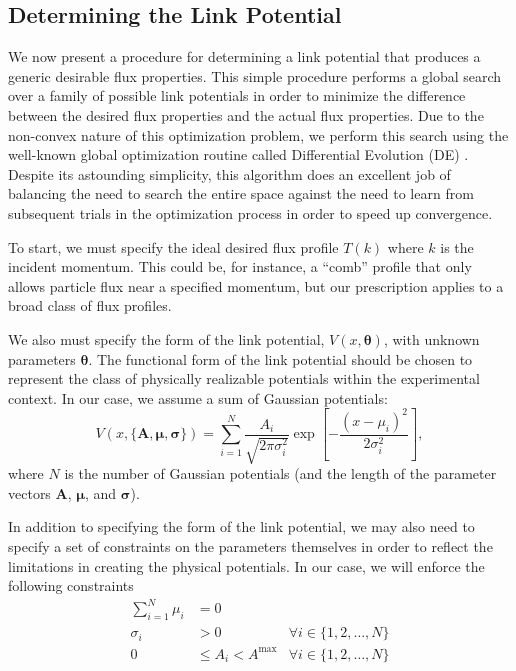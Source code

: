 \documentclass[onecolumn,amsmath,amssymb,nofootinbib,prl]{revtex4-1}
\begin{document}
\subsection{Determining the Link Potential}
We now present a procedure for determining a link potential that produces a generic desirable flux properties. This simple procedure performs a global search over a family of possible link potentials in order to minimize the difference between the desired flux properties and the actual flux properties. Due to the non-convex nature of this optimization problem, we perform this search using the well-known global optimization routine called Differential Evolution (DE) \cite{original DE paper}. Despite its astounding simplicity, this algorithm does an excellent job of balancing the need to search the entire space against the need to learn from subsequent trials in the optimization process in order to speed up convergence. 

To start, we must specify the ideal desired flux profile $T(k)$ where $k$ is the incident momentum. This could be, for instance, a ``comb'' profile that only allows particle flux near a specified momentum, but our prescription applies to a broad class of flux profiles.

We also must specify the form of the link potential, $V(x, \bm{\theta})$, with unknown parameters $\bm{\theta}$. The functional form of the link potential should be chosen to represent the class of physically realizable potentials within the experimental context. In our case, we assume a sum of Gaussian potentials:
\begin{equation}
V(x,\{\bm{A},\bm{\mu},\bm{\sigma} \}) = \sum_{i=1}^{N}\frac{A_i}{\sqrt{2\pi\sigma_i^2}}\exp\left[{-\frac{(x-\mu_i)^2}{2\sigma_i^2}}\right],
\end{equation}
where $N$ is the number of Gaussian potentials (and the length of the parameter vectors $\bm{A}$, $\bm{\mu}$, and $\bm{\sigma}$).

In addition to specifying the form of the link potential, we may also need to specify a set of constraints on the parameters themselves in order to reflect the limitations in creating the physical potentials. In our case, we will enforce the following constraints
\begin{align}
  \sum_{i=1}^{N}\mu_i &= 0 & \\
  \sigma_i &> 0 &\forall i \in\{1,2,\ldots,N\}\\
  0 &\leq A_i < A^\mathrm{max} &\forall i \in\{1,2,\ldots,N\}             
\end{align}
\end{document}
